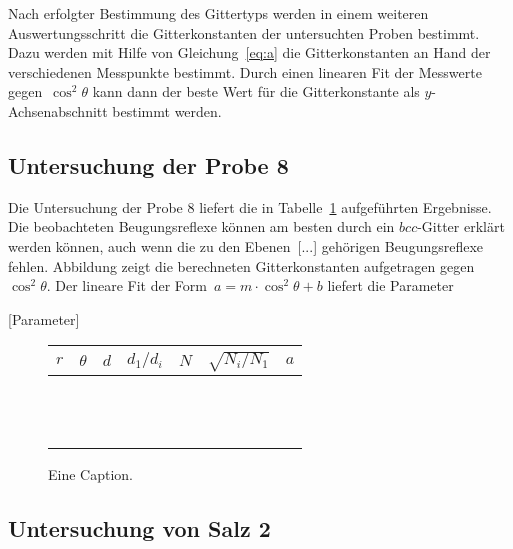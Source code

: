 Nach erfolgter Bestimmung des Gittertyps werden in einem weiteren
Auswertungsschritt die Gitterkonstanten der untersuchten Proben bestimmt. Dazu
werden mit Hilfe von Gleichung~\eqref{eq:a} die Gitterkonstanten an Hand der
verschiedenen Messpunkte bestimmt. Durch einen linearen Fit der Messwerte
gegen~$\cos^2{\theta}$ kann dann der beste Wert für die Gitterkonstante als
$y$-Achsenabschnitt bestimmt werden.

\subsection{Untersuchung der Probe 8}

Die Untersuchung der Probe 8 liefert die in Tabelle~\ref{tab:probe8}
aufgeführten Ergebnisse. Die beobachteten Beugungsreflexe können am besten durch
ein $bcc$-Gitter erklärt werden können, auch wenn die zu den Ebenen~[...]
gehörigen Beugungsreflexe fehlen. Abbildung zeigt die berechneten
Gitterkonstanten aufgetragen gegen~$\cos^2{\theta}$. Der lineare Fit
der Form~$a=m\cdot\cos^2{\theta}+b$ liefert die Parameter

[Parameter]

\begin{figure}[h]
  \centering
  \caption{Eine Caption.}
  \begin{tabular}{S[table-format=3(1)]
                  S[table-format=2.1(1)]
                  S[table-format=1.3(3)]
                  S[table-format=1.2(2)]
                  S[table-format=2]
                  S[table-format=2.3]
                  S[table-format=1.2(2)]}
    \toprule
    {$r$}  & {$\theta$} & {$d$} & {$d_1/d_i$} & {$N$} & {$\sqrt{N_i/N_1}$} & {$a$} \\
    \midrule
    \\
    \\
    \\
    \\
    \\
    \\
    \\
    \\
    \\
    \\
    \\
    \\
    \bottomrule
  \end{tabular}
  \label{tab:probe8}
\end{figure}

\subsection{Untersuchung von Salz 2}

